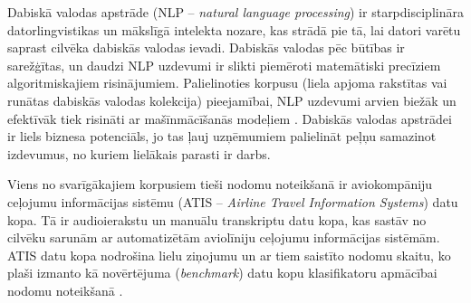 Dabiskā valodas apstrāde (NLP -- \textit{natural language processing}) ir starpdisciplināra datorlingvistikas un mākslīgā intelekta nozare, kas strādā pie tā, lai datori varētu saprast cilvēka dabiskās valodas ievadi. Dabiskās valodas pēc būtības ir sarežģītas, un daudzi NLP uzdevumi ir slikti piemēroti matemātiski precīziem algoritmiskajiem risinājumiem. Palielinoties korpusu (liela apjoma rakstītas vai runātas dabiskās valodas kolekcija) pieejamībai, NLP uzdevumi arvien biežāk un efektīvāk tiek risināti ar mašīnmācīšanās modeļiem \cite{nlp2018}. Dabiskās valodas apstrādei ir liels biznesa potenciāls, jo tas ļauj uzņēmumiem palielināt peļņu samazinot izdevumus, no kuriem lielākais parasti ir darbs.


Viens no svarīgākajiem korpusiem tieši nodomu noteikšanā ir aviokompāniju ceļojumu informācijas sistēmu (ATIS -- \textit{Airline Travel Information Systems}) datu kopa. Tā ir audioierakstu un manuālu transkriptu datu kopa, kas sastāv no cilvēku sarunām ar automatizētām aviolīniju ceļojumu informācijas sistēmām. ATIS datu kopa nodrošina lielu ziņojumu un ar tiem saistīto nodomu skaitu, ko plaši izmanto kā novērtējuma (\textit{benchmark}) datu kopu klasifikatoru apmācībai nodomu noteikšanā \cite{atis1990}.
